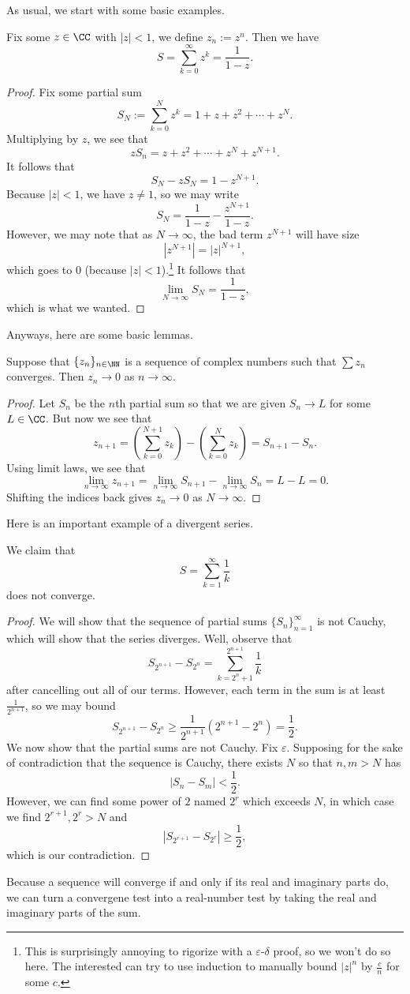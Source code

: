 As usual, we start with some basic examples.
\begin{exe}
	Fix some $z\in\CC$ with $|z|<1$, we define $z_n:=z^n$. Then we have
	\[S=\sum_{k=0}^\infty z^k=\frac1{1-z}.\]
\end{exe}
\begin{proof}
	Fix some partial sum
	\[S_N:=\sum_{k=0}^Nz^k=1+z+z^2+\cdots+z^N.\]
	Multiplying by $z$, we see that
	\[zS_n=z+z^2+\cdots+ z^N+z^{N+1}.\]
	It follows that
	\[S_N-zS_N=1-z^{N+1}.\]
	Because $|z|<1$, we have $z\ne1$, so we may write
	\[S_N=\frac1{1-z}-\frac{z^{N+1}}{1-z}.\]
	However, we may note that as $N\to\infty$, the bad term $z^{N+1}$ will have size
	\[\left|z^{N+1}\right|=|z|^{N+1},\]
	which goes to $0$ (because $|z|<1$).\footnote{This is surprisingly annoying to rigorize with a $\varepsilon$-$\delta$ proof, so we won't do so here. The interested can try to use induction to manually bound $|z|^n$ by $\frac cn$ for some $c$.} It follows that
	\[\lim_{N\to\infty}S_N=\frac1{1-z},\]
	which is what we wanted.
\end{proof}
Anyways, here are some basic lemmas.
\begin{lemma} \label{lem:divtest}
	Suppose that $\{z_n\}_{n\in\NN}$ is a sequence of complex numbers such that $\sum z_n$ converges. Then $z_n\to0$ as $n\to\infty$.
\end{lemma}
\begin{proof}
	Let $S_n$ be the $n$th partial sum so that we are given $S_n\to L$ for some $L\in\CC$. But now we see that
	\[z_{n+1}=\left(\sum_{k=0}^{N+1}z_k\right)-\left(\sum_{k=0}^{N}z_k\right)=S_{n+1}-S_n.\]
	Using limit laws, we see that
	\[\lim_{n\to\infty}z_{n+1}=\lim_{n\to\infty}S_{n+1}-\lim_{n\to\infty}S_n=L-L=0.\]
	Shifting the indices back gives $z_n\to0$ as $N\to\infty$.
\end{proof}
Here is an important example of a divergent series.
\begin{exe}
	We claim that
	\[S=\sum_{k=1}^\infty\frac1k\]
	does not converge.
\end{exe}
\begin{proof}
	We will show that the sequence of partial sums $\{S_n\}_{n=1}^\infty$ is not Cauchy, which will show that the series diverges. Well, observe that
	\[S_{2^{n+1}}-S_{2^n}=\sum_{k=2^n+1}^{2^{n+1}}\frac1k\]
	after cancelling out all of our terms. However, each term in the sum is at least $\frac1{2^{n+1}}$, so we may bound
	\[S_{2^{n+1}}-S_{2^n}\ge\frac1{2^{n+1}}\left(2^{n+1}-2^n\right)=\frac12.\]
	We now show that the partial sums are not Cauchy. Fix $\varepsilon$. Supposing for the sake of contradiction that the sequence is Cauchy, there exists $N$ so that $n,m>N$ has
	\[|S_n-S_m|<\frac12.\]
	However, we can find some power of $2$ named $2^r$ which exceeds $N$, in which case we find $2^{r+1},2^r>N$ and
	\[|S_{2^{r+1}}-S_{2^r}|\ge\frac12,\]
	which is our contradiction.
\end{proof}
\begin{remark}
	Because a sequence will converge if and only if its real and imaginary parts do, we can turn a convergene test into a real-number test by taking the real and imaginary parts of the sum.
\end{remark}

